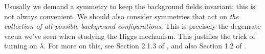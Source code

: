 \documentclass[a4paper
	,10pt
]{article}
\begin{document}
	Ususally we demand a symmetry to keep the background fields invariant; this is not always convenient. We should also consider symmetries that act on \textit{the collection of all possible background configurations}. This is precisely the degenrate vacua we've seen when studying the Higgs mechanism. This justifies the trick of turning on $\lambda$. For more on this, see Section 2.1.3 of \textcite{Banados:2016zim}, and also Section 1.2 of \cite{Lai:2021abc}. 
	
	
\vspace{1.2\baselineskip}
\pagebreak[4]
\raggedright
\printbibliography[%
	,heading = bibintoc
]
\end{document}

